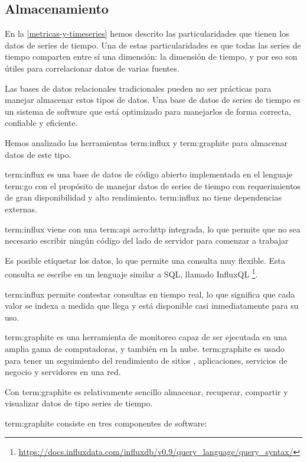 \subsection{Almacenamiento}
\label{almacenamiento}

En la \autoref{metricas-y-timeseries} hemos descrito las particularidades que
tienen los datos de series de tiempo. Una de estas particularidades es que
todas las series de tiempo comparten entre sí una dimensión: la dimensión de
tiempo, y por eso son útiles para correlacionar datos de varias fuentes.

Las bases de datos relacionales tradicionales pueden no ser prácticas para
manejar almacenar estos tipos de datos. Una base de datos de series de tiempo
es un sistema de software que está optimizado para manejarlos de forma
correcta, confiable y eficiente.

Hemos analizado las herramientas \gls{term:influx} y \gls{term:graphite} para
almacenar datos de este tipo.

\gls{term:influx} es una base de datos de código abierto implementada en el
lenguaje \gls{term:go} con el propósito de manejar datos de series de tiempo
con requerimientos de gran disponibilidad y alto rendimiento. \gls{term:influx}
no tiene dependencias externas.

\gls{term:influx} viene con una \gls{term:api} \gls{acro:http} integrada, lo
que permite que no sea necesario escribir ningún código del lado de servidor
para comenzar a trabajar~\cite{influxdb}

Es posible etiquetar los datos, lo que permite una consulta muy flexible. Esta
consulta se escribe en un lenguaje similar a SQL, llamado InfluxQL
\footnote{\url{https://docs.influxdata.com/influxdb/v0.9/query_language/query_syntax/}}.

\gls{term:influx} permite contestar consultas en tiempo real, lo que significa
que cada valor se indexa a medida que llega y está disponible casi
inmediatamente para su uso.

\gls{term:graphite} es una herramienta de monitoreo capaz de ser ejecutada en
una amplia gama de computadoras, y también en la nube. \gls{term:graphite} es
usado para tener un seguimiento del rendimiento de sitios ,
aplicaciones, servicios de negocio y servidores en una red.

Con \gls{term:graphite} es relativamente sencillo almacenar, recuperar,
compartir y visualizar datos de tipo series de tiempo.

\gls{term:graphite} consiste en tres componentes de software:

